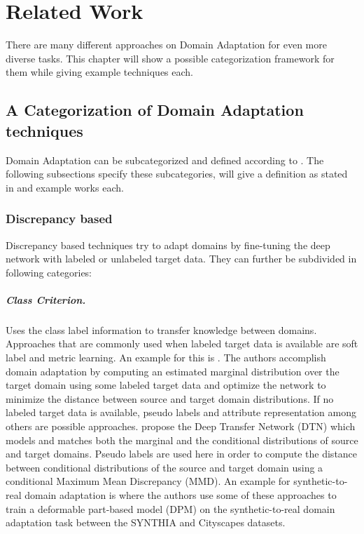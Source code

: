 \chapter{Related Work}
\label{sec:related_work}
There are many different approaches on Domain Adaptation for even more diverse tasks. This chapter will show a possible categorization framework for them while giving example techniques each.

\section{A Categorization of Domain Adaptation techniques}
Domain Adaptation can be subcategorized and defined according to \cite{DBLP:journals/corr/Csurka17}. The following subsections specify these subcategories, will give a definition as stated in \cite{DBLP:journals/corr/abs-1802-03601} and example works each.

\subsection{Discrepancy based}
Discrepancy based techniques try to adapt domains by fine-tuning the deep network with labeled or unlabeled target data. They can further be subdivided in following categories:

\paragraph{Class Criterion.}
Uses the class label information to transfer knowledge between domains. Approaches that are commonly used when labeled target data is available are soft label and metric learning. An example for this is \cite{DBLP:journals/corr/TzengHDS15}. The authors accomplish domain adaptation by computing an estimated marginal distribution over the target domain using some labeled target data and optimize the network to minimize the distance between source and target domain distributions. If no labeled target data is available, pseudo labels and attribute representation among others are possible approaches. \cite{DBLP:journals/corr/ZhangYCW15} propose the Deep Transfer Network (DTN) which models and matches both the marginal and the conditional distributions of source and target domains. Pseudo labels are used here in order to compute the distance between conditional distributions of the source and target domain using a conditional Maximum Mean Discrepancy (MMD). An example for synthetic-to-real domain adaptation is \cite{DBLP:journals/corr/LopezXGVR16} where the authors use some of these approaches to train a deformable part-based model (DPM) on the synthetic-to-real domain adaptation task between the SYNTHIA \cite{RosCVPR16} and Cityscapes \cite{Cordts_2016_CVPR} datasets.


